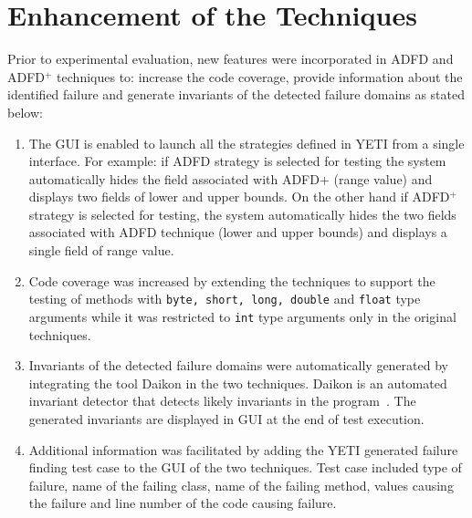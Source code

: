 \section{Enhancement of the Techniques}
Prior to experimental evaluation, new features were incorporated in ADFD and ADFD$^+$ techniques to: increase the code coverage, provide information about the identified failure and generate invariants of the detected failure domains as stated below: 
\begin{enumerate}

\item The GUI is enabled to launch all the strategies defined in YETI from a single interface. For example: if ADFD strategy is selected for testing the system automatically hides the field associated with ADFD+ (range value) and displays two fields of lower and upper bounds. On the other hand if ADFD$^+$ strategy is selected for testing, the system automatically hides the two fields associated with ADFD technique (lower and upper bounds) and displays a single field of range value.

\clearpage
\newpage 

\item Code coverage was increased by extending the techniques to support the testing of methods with \verb+byte, short, long, double+ and \verb+float+ type arguments while it was restricted to \verb+int+ type arguments only in the original techniques.

\item Invariants of the detected failure domains were automatically generated by integrating the tool Daikon in the two techniques. Daikon is an automated invariant detector that detects likely invariants in the program~\cite{ernst2007daikon}. The generated invariants are displayed in GUI at the end of test execution. 

\item Additional information was facilitated by adding the YETI generated failure finding test case to the GUI of the two techniques. Test case included type of failure, name of the failing class, name of the failing method, values causing the failure and line number of the code causing failure.





\end{enumerate}

